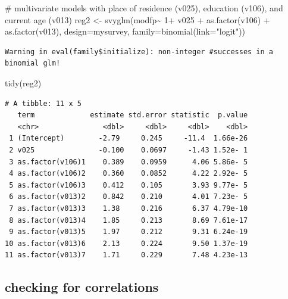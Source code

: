\documentclass[
  letterpaper,
  DIV=11,
  numbers=noendperiod]{scrartcl}
\newenvironment{Shaded}{\begin{snugshade}}{\end{snugshade}}
\newcommand{\AttributeTok}[1]{\textcolor[rgb]{0.40,0.45,0.13}{#1}}
\newcommand{\CommentTok}[1]{\textcolor[rgb]{0.37,0.37,0.37}{#1}}
\newcommand{\DecValTok}[1]{\textcolor[rgb]{0.68,0.00,0.00}{#1}}
\newcommand{\FunctionTok}[1]{\textcolor[rgb]{0.28,0.35,0.67}{#1}}
\newcommand{\NormalTok}[1]{\textcolor[rgb]{0.00,0.23,0.31}{#1}}
\newcommand{\OtherTok}[1]{\textcolor[rgb]{0.00,0.23,0.31}{#1}}
\newcommand{\SpecialCharTok}[1]{\textcolor[rgb]{0.37,0.37,0.37}{#1}}
\newcommand{\StringTok}[1]{\textcolor[rgb]{0.13,0.47,0.30}{#1}}
\begin{document}
\begin{Shaded}
\begin{Highlighting}[]
\CommentTok{\# multivariate models with place of residence (v025), education (v106), and current age (v013)}
\NormalTok{reg2 }\OtherTok{\textless{}{-}} \FunctionTok{svyglm}\NormalTok{(modfp}\SpecialCharTok{\textasciitilde{}} \DecValTok{1}\SpecialCharTok{+}\NormalTok{ v025 }\SpecialCharTok{+} \FunctionTok{as.factor}\NormalTok{(v106) }\SpecialCharTok{+} \FunctionTok{as.factor}\NormalTok{(v013), }\AttributeTok{design=}\NormalTok{mysurvey, }\AttributeTok{family=}\FunctionTok{binomial}\NormalTok{(}\AttributeTok{link=}\StringTok{"logit"}\NormalTok{))}
\end{Highlighting}
\end{Shaded}

\begin{verbatim}
Warning in eval(family$initialize): non-integer #successes in a binomial glm!
\end{verbatim}

\begin{Shaded}
\begin{Highlighting}[]
\FunctionTok{tidy}\NormalTok{(reg2)}
\end{Highlighting}
\end{Shaded}

\begin{verbatim}
# A tibble: 11 x 5
   term             estimate std.error statistic  p.value
   <chr>               <dbl>     <dbl>     <dbl>    <dbl>
 1 (Intercept)        -2.79     0.245     -11.4  1.66e-26
 2 v025               -0.100    0.0697     -1.43 1.52e- 1
 3 as.factor(v106)1    0.389    0.0959      4.06 5.86e- 5
 4 as.factor(v106)2    0.360    0.0852      4.22 2.92e- 5
 5 as.factor(v106)3    0.412    0.105       3.93 9.77e- 5
 6 as.factor(v013)2    0.842    0.210       4.01 7.23e- 5
 7 as.factor(v013)3    1.38     0.216       6.37 4.79e-10
 8 as.factor(v013)4    1.85     0.213       8.69 7.61e-17
 9 as.factor(v013)5    1.97     0.212       9.31 6.24e-19
10 as.factor(v013)6    2.13     0.224       9.50 1.37e-19
11 as.factor(v013)7    1.71     0.229       7.48 4.23e-13
\end{verbatim}

\hypertarget{checking-for-correlations}{%
\subsection{checking for correlations}\label{checking-for-correlations}}
\end{document}
